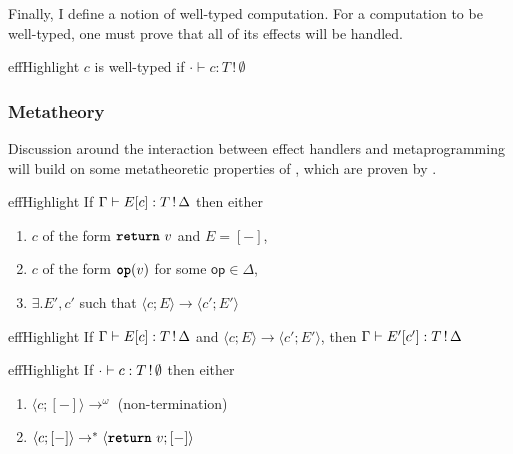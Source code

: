Finally, I define a notion of well-typed computation. For a computation to be well-typed, one must prove that all of its effects will be handled.  
\begin{definition}{effHighlight}
  $c$ is well-typed if $\cdot \vdash {c}: {T \, ! \, \emptyset}$
\end{definition}

\subsubsection{Metatheory}
Discussion around the interaction between effect handlers and metaprogramming will build on some metatheoretic properties of \efflang{}, which are proven by \citet{bauer-2014}.

\renewcommand{\effconfiguration}[2]{\langle {#1}; {#2} \rangle}
\renewcommand{\transition}[2]{#1 \rightarrow #2}

\begin{theorem}[Progress]{effHighlight}\label{thm:progress}
If $\type{E[c]}{\effectType{T}}$ then either 
\begin{enumerate}
\item $c$ of the form $\return{v}$ and $E = [-]$,
\item $c$ of the form $\op{v}$ for some $\textsf{op} \in \Delta$,
\item $\exists. E', c'$ such that $\transition{\effconfiguration{c}{E}}{\effconfiguration{c'}{E'}}$
\end{enumerate}
\end{theorem}
\vspace{-\baselineskip}
\begin{theorem}[Preservation]{effHighlight}\label{thm:preservation}
If $\type{E[c]}{\effectType{T}}$ and $\transition{\effconfiguration{c}{E}}{\effconfiguration{c'}{E'}}$, then $\type{E'[c']}{\effectType{T}}$
\end{theorem}
\vspace{-\baselineskip}
\begin{corollary}{effHighlight}\label{thm:type-safety}
  If $\cdot \vdash {c}: {\effectType[\emptyset]{T}}$ then either 
\begin{enumerate}
\item $\langle c; [-] \rangle \to^{\omega}$ (non-termination)
\item $\langle c; [-] \rangle \to^{*} \langle \return{v}; [-] \rangle$
\end{enumerate}
\end{corollary}

